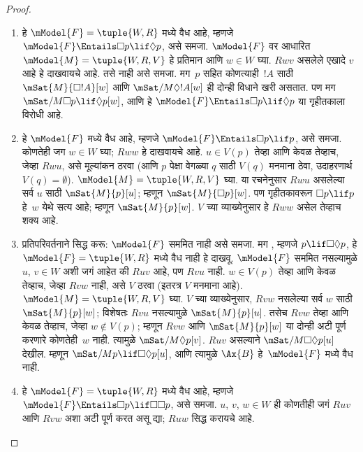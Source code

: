 \documentclass[../../../include/open-logic-section]{subfiles}
\begin{document}
\begin{proof}
  \begin{enumerate}
  \item {} हे $\mModel{F} = \tuple{W, R}$ मध्ये वैध आहे,
    म्हणजे $\mModel{F} \Entails \Box p \lif \Diamond p$,
    असे समजा. $\mModel{F}$ वर आधारित
    $\mModel{M} = \tuple{W, R, V}$ हे प्रतिमान आणि
    $w \in W$ घ्या. $Rwv$ असलेले एखादे $v$ आहे हे
    दाखवायचे आहे. तसे नाही असे समजा. मग~$p$ सहित
    कोणत्याही~$!A$ साठी $\mSat{M}{\Box !A}[w]$ आणि
    $\mSat/{M}{\Diamond !A}[w]$ ही दोन्ही विधाने खरी
    असतात. पण मग $\mSat/{M}{\Box p \lif
      \Diamond p}[w]$, आणि हे $\mModel{F}
    \Entails \Box p \lif \Diamond p$ या गृहीतकाला
    विरोधी आहे.
  \item {} हे $\mModel{F}$ मध्ये वैध आहे,
    म्हणजे $\mModel{F} \Entails \Box
    p \lif p$, असे समजा. कोणतेही जग $w \in W$ घ्या;
    $Rww$ हे दाखवायचे आहे. $u \in V(p)$ तेव्हा आणि
    केवळ तेव्हाच, जेव्हा $Rwu$, असे मूल्यांकन
    ठरवा (आणि $p$ पेक्षा वेगळ्या $q$ साठी $V(q)$
    मनमाना ठेवा, उदाहरणार्थ $V(q) = \emptyset$).
    $\mModel{M} = \tuple{W, R, V}$ घ्या. या रचनेनुसार
    $Rwu$ असलेल्या सर्व $u$ साठी $\mSat{M}{p}[u]$;
    म्हणून $\mSat{M}{\Box p}[w]$. पण गृहीतकावरून
    $\Box p \lif p$ हे~$w$ येथे सत्य आहे; म्हणून
    $\mSat{M}{p}[w]$. $V$ च्या व्याख्येनुसार हे
    $Rww$ असेल तेव्हाच शक्य आहे.
  \item प्रतिपरिवर्तनाने सिद्ध करू: $\mModel{F}$ सममित
    नाही असे समजा. मग , म्हणजे
    $p \lif \Box\Diamond p$, हे
    $\mModel{F}= \tuple{W, R}$ मध्ये वैध नाही हे
    दाखवू. $\mModel{F}$ सममित नसल्यामुळे
    $u$, $v \in W$ अशी जगं आहेत की $Ruv$ आहे,
    पण $Rvu$ नाही. $w \in V(p)$ तेव्हा आणि केवळ
    तेव्हाच, जेव्हा $Rvw$ नाही, असे $V$ ठरवा (इतरत्र
    $V$ मनमाना आहे). $\mModel{M} =\tuple{W, R,
      V}$ घ्या. $V$ च्या व्याख्येनुसार, $Rvw$
    नसलेल्या सर्व $w$ साठी $\mSat{M}{p}[w]$;
    विशेषतः $Rvu$ नसल्यामुळे $\mSat{M}{p}[u]$.
    तसेच $Rvw$ तेव्हा आणि केवळ तेव्हाच, जेव्हा
    $w \notin V(p)$; म्हणून $Rvw$ आणि
    $\mSat{M}{p}[w]$ या दोन्ही अटी पूर्ण करणारे
    कोणतेही~$w$ नाही. त्यामुळे
    $\mSat/{M}{\Diamond p}[v]$. $Ruv$ असल्याने
    $\mSat/{M}{\Box\Diamond p}[u]$ देखील. म्हणून
    $\mSat/{M}{p \lif
      \Box\Diamond p}[u]$, आणि त्यामुळे
    $\Ax{B}$ हे~$\mModel{F}$ मध्ये वैध नाही.
  \item {} हे $\mModel{F} = \tuple{W,R}$ मध्ये
    वैध आहे, म्हणजे $\mModel{F} \Entails \Box p
    \lif \Box\Box p$, असे समजा. $u$, $v$, $w \in W$
    ही कोणतीही जगं $Ruv$ आणि $Rvw$ अशा अटी पूर्ण
    करत असू द्या; $Ruw$ सिद्ध करायचे आहे.

\end{enumerate}
\end{proof}
\end{document}
